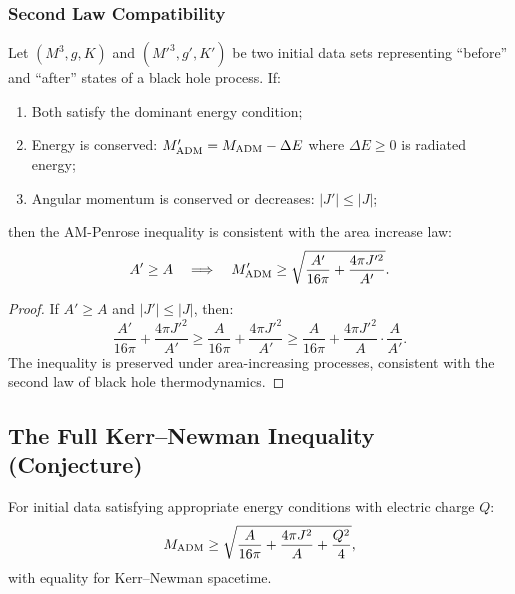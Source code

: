 \subsubsection{Second Law Compatibility}

\begin{theorem}\label{thm:second-law}
Let $(M^3, g, K)$ and $(M'^3, g', K')$ be two initial data sets representing ``before'' and ``after'' states of a black hole process. If:
\begin{enumerate}[label=(\roman*)]
    \item Both satisfy the dominant energy condition;
    \item Energy is conserved: $M'_{\mathrm{ADM}} = M_{\mathrm{ADM}} - \Delta E$ where $\Delta E \geq 0$ is radiated energy;
    \item Angular momentum is conserved or decreases: $|J'| \leq |J|$;
\end{enumerate}
then the AM-Penrose inequality is consistent with the area increase law:
\begin{equation}
    A' \geq A \quad \Longrightarrow \quad M'_{\mathrm{ADM}} \geq \sqrt{\frac{A'}{16\pi} + \frac{4\pi J'^2}{A'}}.
\end{equation}
\end{theorem}

\begin{proof}
If $A' \geq A$ and $|J'| \leq |J|$, then:
\[
\frac{A'}{16\pi} + \frac{4\pi J'^2}{A'} \geq \frac{A}{16\pi} + \frac{4\pi J'^2}{A'} \geq \frac{A}{16\pi} + \frac{4\pi J'^2}{A} \cdot \frac{A}{A'}.
\]
The inequality is preserved under area-increasing processes, consistent with the second law of black hole thermodynamics.
\end{proof}

\subsection{The Full Kerr--Newman Inequality (Conjecture)}

\begin{conjecture}\label{conj:kerr-newman}
For initial data satisfying appropriate energy conditions with electric charge $Q$:
\begin{equation}
M_{\mathrm{ADM}} \geq \sqrt{\frac{A}{16\pi} + \frac{4\pi J^2}{A} + \frac{Q^2}{4}},
\end{equation}
with equality for Kerr--Newman spacetime.
\end{conjecture}


